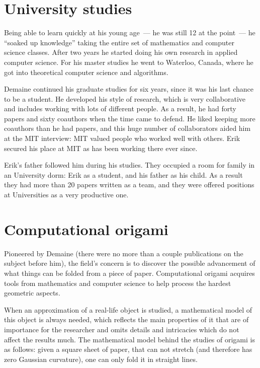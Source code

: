 \documentclass[a4paper,12pt]{article}
\begin{document}
\section{University studies}

Being able to learn quickly at his young age~— he was still 12 at the point~— he “soaked up knowledge” taking the entire set of mathematics and computer science classes. After two years he started doing his own research in applied computer science. For his master studies he went to Waterloo, Canada, where he got into theoretical computer science and algorithms.

Demaine continued his graduate studies for six years, since it was his last chance to be a student. He developed his style of research, which is very collaborative and includes working with lots of different people. As a result, he had forty papers and sixty coauthors when the time came to defend. He liked keeping more coauthors than he had papers, and this huge number of collaborators aided him at the MIT interview: MIT valued people who worked well with others. Erik secured his place at MIT as has been working there ever since.

Erik's father followed him during his studies. They occupied a room for family in an University dorm: Erik as a student, and his father as his child. As a result they had more than 20 papers written as a team, and they were offered positions at Universities as a very productive one.

\section{Computational origami}

Pioneered by Demaine (there were no more than a couple publications on the subject before him), the field's concern is to discover the possible advancement of what things can be folded from a piece of paper. Computational origami acquires tools from mathematics and computer science to help process the hardest geometric aspects.

When an approximation of a real-life object is studied, a mathematical model of this object is always needed, which reflects the main properties of it that are of importance for the researcher and omits details and intricacies which do not affect the results much. The mathematical model behind the studies of origami is as follows: given a square sheet of paper, that can not stretch (and therefore has zero Gaussian curvature), one can only fold it in straight lines.
\end{document}

